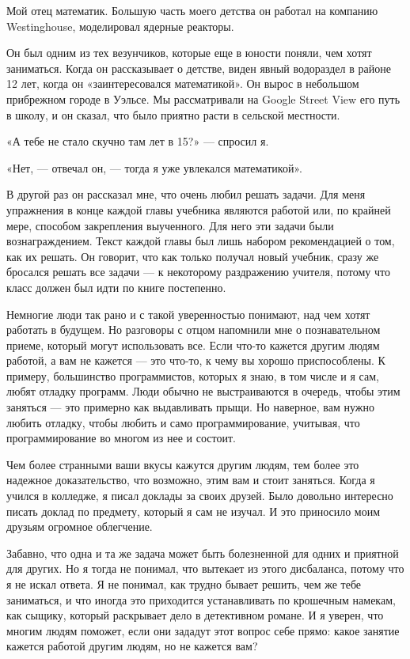 \documentclass[ebook,12pt,oneside,openany]{memoir}
\author{Пол Грэм} \date{}
\begin{document}
\maketitle

Мой отец математик. Большую часть моего детства он работал на компанию
Westinghouse, моделировал ядерные реакторы.

Он был одним из тех везунчиков, которые еще в юности поняли, чем хотят
заниматься. Когда он рассказывает о детстве, виден явный водораздел в
районе 12 лет, когда он «заинтересовался математикой». Он вырос в
небольшом прибрежном городе в Уэльсе. Мы рассматривали на Google
Street View его путь в школу, и он сказал, что было приятно расти в
сельской местности.

«А тебе не стало скучно там лет в 15?» — спросил я.

«Нет, — отвечал он, — тогда я уже увлекался математикой».

В другой раз он рассказал мне, что очень любил решать задачи. Для меня
упражнения в конце каждой главы учебника являются работой или, по
крайней мере, способом закрепления выученного. Для него эти задачи
были вознаграждением. Текст каждой главы был лишь набором
рекомендацией о том, как их решать. Он говорит, что как только получал
новый учебник, сразу же бросался решать все задачи — к некоторому
раздражению учителя, потому что класс должен был идти по книге
постепенно.

Немногие люди так рано и с такой уверенностью понимают, над чем хотят
работать в будущем. Но разговоры с отцом напомнили мне о
познавательном приеме, который могут использовать все. Если что-то
кажется другим людям работой, а вам не кажется — это что-то, к чему вы
хорошо приспособлены. К примеру, большинство программистов, которых я
знаю, в том числе и я сам, любят отладку программ. Люди обычно не
выстраиваются в очередь, чтобы этим заняться — это примерно как
выдавливать прыщи. Но наверное, вам нужно любить отладку, чтобы любить
и само программирование, учитывая, что программирование во многом из
нее и состоит.

Чем более странными ваши вкусы кажутся другим людям, тем более это
надежное доказательство, что возможно, этим вам и стоит заняться.
Когда я учился в колледже, я писал доклады за своих друзей. Было
довольно интересно писать доклад по предмету, который я сам не изучал.
И это приносило моим друзьям огромное облегчение.

Забавно, что одна и та же задача может быть болезненной для одних и
приятной для других. Но я тогда не понимал, что вытекает из этого
дисбаланса, потому что я не искал ответа. Я не понимал, как трудно
бывает решить, чем же тебе заниматься, и что иногда это приходится
устанавливать по крошечным намекам, как сыщику, который раскрывает
дело в детективном романе. И я уверен, что многим людям поможет, если
они зададут этот вопрос себе прямо: какое занятие кажется работой
другим людям, но не кажется вам?
\end{document}
